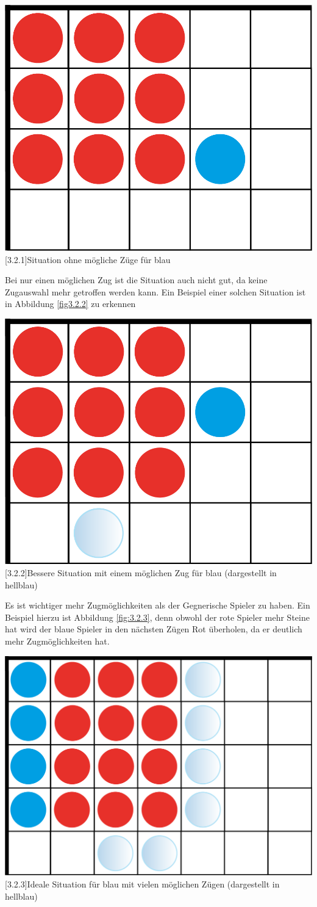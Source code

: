 \documentclass[12pt,a4paper,bibliography=totocnumbered,listof=totocnumbered]{scrartcl}
\begin{document}
   	\vspace{1em}
	\begin{minipage}{\linewidth}
		\centering
		\includegraphics[width=0.33\linewidth]{pics/Kapitel_3/Kapitel_3_pic5.png}
		[3.2.1]{Situation ohne mögliche Züge für blau}
		\label{fig:3.2.1}
	\end{minipage}
	\vspace{1em}
	

   Bei nur einen möglichen Zug ist die Situation auch nicht gut, da keine Zugauswahl mehr getroffen werden kann. Ein Beispiel einer solchen Situation ist in Abbildung \ref{fig3.2.2} zu erkennen

   	\vspace{1em}
	\begin{minipage}{\linewidth}
		\centering
		\includegraphics[width=0.33\linewidth]{pics/Kapitel_3/Kapitel_3_pic6.png}
		[3.2.2]{Bessere Situation mit einem möglichen Zug für blau (dargestellt in hellblau)}
		\label{fig:3.2.2}
	\end{minipage}
	\vspace{1em}
	
	
   Es ist wichtiger mehr Zugmöglichkeiten als der Gegnerische Spieler zu haben. Ein Beispiel hierzu ist Abbildung \ref{fig:3.2.3}, denn obwohl der rote Spieler mehr Steine hat wird der blaue Spieler in den nächsten Zügen Rot überholen, da er deutlich mehr Zugmöglichkeiten hat.


   	\vspace{1em}
	\begin{minipage}{\linewidth}
		\centering
		\includegraphics[width=0.33\linewidth]{pics/Kapitel_3/Kapitel_3_pic7.png}
		[3.2.3]{Ideale Situation für blau mit vielen möglichen Zügen (dargestellt in hellblau)}
		\label{fig:3.2.3}
	\end{minipage}
	\vspace{1em}
	
\end{document}
